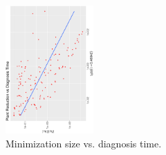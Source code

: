 \begin{figure}[bt]
	\centering
	\SmallPicture
	\includegraphics[width=0.3\textwidth, angle=-90]{../experimental_setting/tmp_results/reduction_vs_diag_time.ps}
	\vspace*{-2mm}
	\caption{Minimization size vs. diagnosis time.}
	\label{fig:reduction_vs_diag_time}
	\vspace*{-4mm}
	\MediumPicture
\end{figure}


